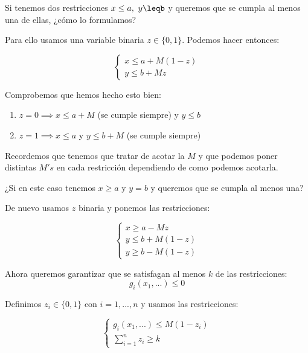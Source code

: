 \documentclass[openany]{book}
\begin{document}
\begin{exercise}
Si tenemos dos restricciones $ x\leq a,\ y\leqb $ y queremos que se cumpla al menos una de ellas, ¿cómo lo formulamos?

Para ello usamos una variable binaria $ z \in \{0,1\} $. Podemos hacer entonces:

$$ 
\left\{
\begin{array}{l}
  x\leq a +M(1-z)\\
  y\leq b+Mz
\end{array}
\right.
$$

Comprobemos que hemos hecho esto bien:

\begin{enumerate}
  \item $ z = 0 \implies x \leq a+M $ (se cumple siempre) y $ y\leq b $
  \item $ z=1 \implies x \leq a $ y $ y\leq b+M $ (se cumple siempre)
\end{enumerate}

Recordemos que tenemos que tratar de acotar la $ M $ y que podemos poner distintas $ M's $ en cada restricción dependiendo de como podemos acotarla.

\end{exercise}

\begin{exercise}
  ¿Si en este caso tenemos $ x\geq a $ y $ y = b $ y queremos que se cumpla al menos una?

  De nuevo usamos $ z  $ binaria y ponemos las restricciones:

  $$ \left\{
  \begin{array}{l}
    x \geq a-Mz\\
    y\leq b +M(1-z)\\
    y\geq b-M(1-z)
  \end{array}
  \right. $$
\end{exercise}

\begin{exercise}
  Ahora queremos garantizar que se satisfagan al menos $ k $ de las restricciones:
  $$ g_i(x_1,...) \leq 0 $$


  Definimos $ z_i \in \{0,1\} $ con $ i = 1,...,n $ y usamos las restricciones:

  $$ 
  \left\{
  \begin{array}{l}
    g_i(x_1,...) \leq M(1-z_i)\\
    \sum\limits_{i=1}^{n}z_i \geq k
  \end{array}
  \right.
  $$

\end{exercise}
\end{document}
